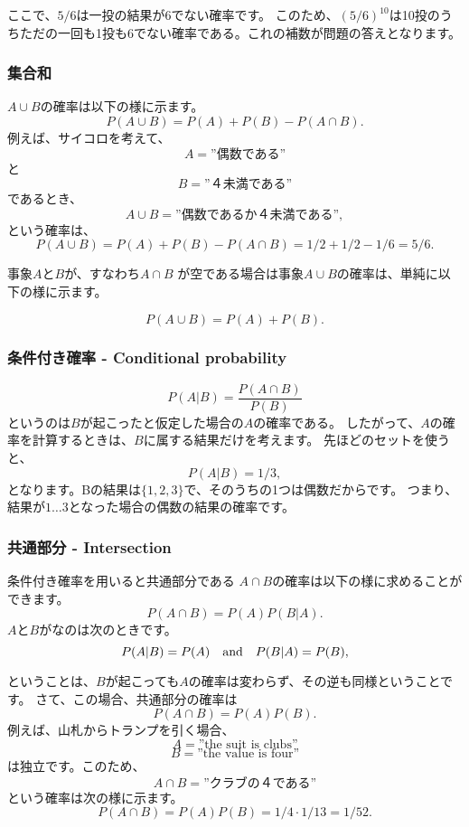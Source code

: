 ここで、$5/6$は一投の結果が$6$でない確率です。
このため、$(5/6)^{10}$は10投のうちただの一回も1投も6でない確率である。これの補数が問題の答えとなります。

\subsubsection{集合和}

$A \cup B$の確率は以下の様に示ます。
\[P(A \cup B)=P(A)+P(B)-P(A \cap B).\]
例えば、サイコロを考えて、
\[A=\textrm{''偶数である''}\]
と
\[B=\textrm{''４未満である''}\]
であるとき、
\[A \cup B=\textrm{''偶数であるか４未満である''},\]
という確率は、
\[P(A \cup B) = P(A)+P(B)-P(A \cap B)=1/2+1/2-1/6=5/6.\]

事象$A$と$B$が、すなわち$A \cap B$ が空である場合は事象$A \cup B$の確率は、単純に以下の様に示ます。

\[P(A \cup B)=P(A)+P(B).\]


\subsubsection{条件付き確率 - Conditional probability}


\[P(A | B) = \frac{P(A \cap B)}{P(B)}\]
というのは$B$が起こったと仮定した場合の$A$の確率である。
したがって、$A$の確率を計算するときは、$B$に属する結果だけを考えます。
先ほどのセットを使うと、
\[P(A | B)= 1/3,\]
となります。Bの結果は$\{1,2,3\}$で、そのうちの1つは偶数だからです。
つまり、結果が$1 \ldots 3$となった場合の偶数の結果の確率です。

\subsubsection{共通部分 - Intersection}


条件付き確率を用いると共通部分である
$A \cap B$の確率は以下の様に求めることができます。
\[P(A \cap B)=P(A)P(B|A).\]
$A$と$B$がなのは次のときです。
\[P(A|B)=P(A) \hspace{10px}\textrm{and}\hspace{10px} P(B|A)=P(B),\]

ということは、$B$が起こっても$A$の確率は変わらず、その逆も同様ということです。
さて、この場合、共通部分の確率は
\[P(A \cap B)=P(A)P(B).\]
例えば、山札からトランプを引く場合、
\[A = \textrm{''the suit is clubs''}\]
\[B = \textrm{''the value is four''}\]
は独立です。このため、
\[A \cap B = \textrm{''クラブの４である''}\]
という確率は次の様に示ます。
\[P(A \cap B)=P(A)P(B)=1/4 \cdot 1/13 = 1/52.\]

